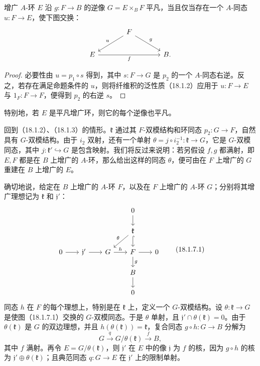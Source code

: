 增广 $A$-环 $E$ 沿 $g:F\to B$ 的逆像 $G=E\times_BF$ 平凡，当且仅当存在一个 $A$-同态 $u:F\to E$，使下图交换：
\[
\begin{tikzcd}[column sep=large]
 & F\arrow[dl,"u"']\arrow[dr,"g"] &\\
 E\arrow[rr,"f"'] && B.
\end{tikzcd}
\]
\begin{proof}
必要性由 $u=p_1\circ s$ 得到，其中 $s:F\to G$ 是 $p_2$ 的一个 $A$-同态右逆。反之，若存在满足命题条件的 $u$，则将纤维积的泛性质（18.1.2）应用于 $u:F\to E$ 与 $1_F:F\to F$，便得到 $p_2$ 的右逆 $s$。
\end{proof}
特别地，若 $E$ 是平凡增广环，则它的每个逆像也平凡。

回到（18.1.2）、（18.1.3）的情形。$\mathfrak k$ 通过其 $F$-双模结构和环同态 $p_2:G\to F$，自然具有 $G$-双模结构。由于 $i_2$ 双射，还有一个单射 $\theta=j\circ i_2^{-1}:\mathfrak k\to G$，它是 $G$-双模同态，其中 $j:\mathfrak k'\hookrightarrow G$ 是包含映射。我们将反过来说明：若另假设 $f,g$ 都满射，即 $E,F$ 都是在 $B$ 上增广的 $A$-环，那么给出这样的同态 $\theta$，便可由在 $F$ 上增广的 $G$ 重建在 $B$ 上增广的 $E$。

确切地说，给定在 $B$ 上增广的 $A$-环 $F$，以及在 $F$ 上增广的 $A$-环 $G$；分别将其增广理想记为 $\mathfrak k$ 和 $\mathfrak j'$：
\begin{equation}
\begin{tikzcd}[column sep=1.9em,row sep=1.5em]
 &&&0\arrow[d] &\\
 &&&\mathfrak k\arrow[d,hook]\arrow[dl,"\theta"'] &\\
 0\arrow[r]&\mathfrak j'\arrow[r]&G\arrow[r,"h"]&F\arrow[r]\arrow[d,"g"]&0\\
 &&&B\arrow[d]&\\
 &&&0&
\end{tikzcd}
\tag{18.1.7.1}
\end{equation}
同态 $h$ 在 $F$ 的每个理想上，特别是在 $\mathfrak k$ 上，定义一个 $G$-双模结构。设 $\theta:\mathfrak k\to G$ 是使图（18.1.7.1）交换的 $G$-双模同态。于是 $\theta$ 单射，且 $\mathfrak j'\cap\theta(\mathfrak k)=0$。由于 $\theta(\mathfrak k)$ 是 $G$ 的双边理想，并且 $h(\theta(\mathfrak k))=\mathfrak k$，复合同态 $g\circ h:G\to B$ 分解为
\[
 G\xrightarrow{q}G/\theta(\mathfrak k)\xrightarrow{f}B,
\]
其中 $f$ 满射。再令 $E=G/\theta(\mathfrak k)$，则 $\mathfrak j'$ 在 $E$ 中的像 $\mathfrak j$ 为 $f$ 的核，因为 $g\circ h$ 的核为 $\mathfrak j'\oplus\theta(\mathfrak k)$；且典范同态 $q:G\to E$ 在 $\mathfrak j'$ 上的限制单射。

